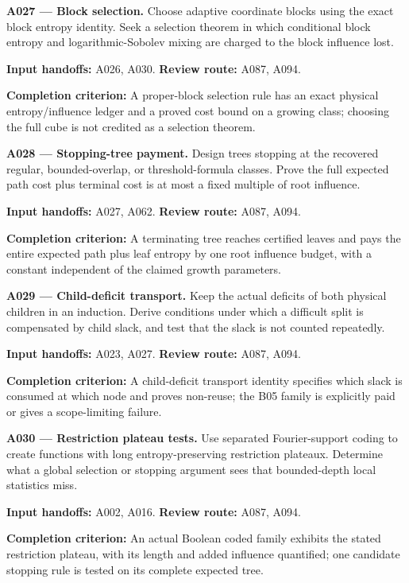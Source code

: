 \documentclass[11pt]{article}
\begin{document}
\textbf{A027 --- Block selection.} Choose adaptive coordinate blocks using the exact block entropy identity. Seek a selection theorem in which conditional block entropy and logarithmic-Sobolev mixing are charged to the block influence lost.

{\small\color{ink}\textbf{Input handoffs:} A026, A030. \textbf{Review route:} A087, A094.\par
\textbf{Completion criterion:} A proper-block selection rule has an exact physical entropy/influence ledger and a proved cost bound on a growing class; choosing the full cube is not credited as a selection theorem.\par}



\textbf{A028 --- Stopping-tree payment.} Design trees stopping at the recovered regular, bounded-overlap, or threshold-formula classes. Prove the full expected path cost plus terminal cost is at most a fixed multiple of root influence.

{\small\color{ink}\textbf{Input handoffs:} A027, A062. \textbf{Review route:} A087, A094.\par
\textbf{Completion criterion:} A terminating tree reaches certified leaves and pays the entire expected path plus leaf entropy by one root influence budget, with a constant independent of the claimed growth parameters.\par}



\textbf{A029 --- Child-deficit transport.} Keep the actual deficits of both physical children in an induction. Derive conditions under which a difficult split is compensated by child slack, and test that the slack is not counted repeatedly.

{\small\color{ink}\textbf{Input handoffs:} A023, A027. \textbf{Review route:} A087, A094.\par
\textbf{Completion criterion:} A child-deficit transport identity specifies which slack is consumed at which node and proves non-reuse; the B05 family is explicitly paid or gives a scope-limiting failure.\par}



\textbf{A030 --- Restriction plateau tests.} Use separated Fourier-support coding to create functions with long entropy-preserving restriction plateaux. Determine what a global selection or stopping argument sees that bounded-depth local statistics miss.

{\small\color{ink}\textbf{Input handoffs:} A002, A016. \textbf{Review route:} A087, A094.\par
\textbf{Completion criterion:} An actual Boolean coded family exhibits the stated restriction plateau, with its length and added influence quantified; one candidate stopping rule is tested on its complete expected tree.\par}
\end{document}
